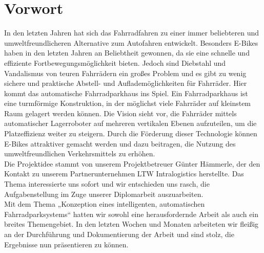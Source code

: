 \section*{Vorwort}
In den letzten Jahren hat sich das Fahrradfahren zu einer immer beliebteren und umweltfreundlicheren Alternative zum Autofahren entwickelt. Besonders E-Bikes haben in den letzten Jahren an Beliebtheit gewonnen, da sie eine schnelle und effiziente Fortbewegungsmöglichkeit bieten. Jedoch sind Diebstahl und Vandalismus von teuren Fahrrädern ein großes Problem und es gibt zu wenig sichere und praktische Abstell- und Auflademöglichkeiten für Fahrräder. Hier kommt das automatische Fahrradparkhaus ins Spiel. Ein Fahrradparkhaus ist eine turmförmige Konstruktion, in der möglichst viele Fahrräder auf kleinstem Raum gelagert werden können. Die Vision sieht vor, die Fahrräder mittels automatischer Lagerroboter auf mehreren vertikalen Ebenen aufzuteilen, um die Platzeffizienz weiter zu steigern. Durch die Förderung dieser Technologie können E-Bikes attraktiver gemacht werden und dazu beitragen, die Nutzung des umweltfreundlichen Verkehrsmittels zu erhöhen.\\
Die Projektidee stammt von unserem Projektbetreuer Günter Hämmerle, der den Kontakt zu unserem Partnerunternehmen LTW Intralogistics herstellte. Das Thema interessierte uns sofort und wir entschieden uns rasch, die Aufgabenstellung im Zuge unserer Diplomarbeit auszuarbeiten.\\
Mit dem Thema „Konzeption eines intelligenten, automatischen Fahrradparksystems“ hatten wir sowohl eine herausfordernde Arbeit als auch ein breites Themengebiet. In den letzten Wochen und Monaten arbeiteten wir fleißig an der Durchführung und Dokumentierung der Arbeit und sind stolz, die Ergebnisse nun präsentieren zu können.\\